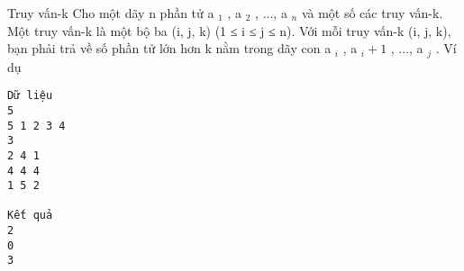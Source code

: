 Truy vấn-k
Cho một dãy n phần tử a   $_    1   $   ,   a   $_    2   $   , ..., a   $_    n   $   và một số các truy vấn-k. Một truy vấn-k là một bộ ba (i, j, k) (1 ≤ i ≤ j ≤ n). Với mỗi truy vấn-k (i, j, k), bạn phải trả về số phần tử lớn hơn k nằm trong dãy con a   $_    i   $   ,   a   $_    i+1   $   , ..., a   $_    j   $   .
Ví dụ
\begin{verbatim}
Dữ liệu
5
5 1 2 3 4
3
2 4 1
4 4 4
1 5 2 

Kết quả
2
0
3 
\end{verbatim}